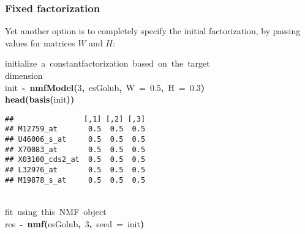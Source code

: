\documentclass[a4paper]{article}\usepackage{graphicx, color}
\makeatletter
\newcommand{\hlnumber}[1]{\textcolor[rgb]{0,0,0}{#1}}%
\newcommand{\hlfunctioncall}[1]{\textcolor[rgb]{0.501960784313725,0,0.329411764705882}{\textbf{#1}}}%
\newcommand{\hlkeyword}[1]{\textcolor[rgb]{0,0,0}{\textbf{#1}}}%
\newcommand{\hlargument}[1]{\textcolor[rgb]{0.690196078431373,0.250980392156863,0.0196078431372549}{#1}}%
\newcommand{\hlcomment}[1]{\textcolor[rgb]{0.180392156862745,0.6,0.341176470588235}{#1}}%
\newcommand{\hlassignement}[1]{\textcolor[rgb]{0,0,0}{\textbf{#1}}}%
\newcommand{\hlsymbol}[1]{\textcolor[rgb]{0,0,0}{#1}}%
\newcommand{\hlstd}[1]{\textcolor[rgb]{0,0,0}{#1}}%
\newenvironment{kframe}{%
 \def\FrameCommand##1{\hskip\@totalleftmargin \hskip-\fboxsep
 \colorbox{shadecolor}{##1}\hskip-\fboxsep
     \hskip-\linewidth \hskip-\@totalleftmargin \hskip\columnwidth}%
 \MakeFramed {\advance\hsize-\width
   \@totalleftmargin\z@ \linewidth\hsize
   \@setminipage}}%
 {\par\unskip\endMakeFramed}
\newenvironment{knitrout}{}{} %
\makeatother
\begin{document}
\subsubsection{Fixed factorization}
Yet another option is to completely specify the initial factorization, by passing values for matrices $W$ and $H$:
\begin{knitrout}
\color{fgcolor}\begin{kframe}
\begin{flushleft}
\ttfamily\noindent
\hlcomment{\usebox{\hlnormalsizeboxhash}{\ }initialize{\ }a{\ }\usebox{\hlnormalsizeboxsinglequote}constant\usebox{\hlnormalsizeboxsinglequote}{\ }factorization{\ }based{\ }on{\ }the{\ }target}\hspace*{\fill}\\
\hlstd{}\hlcomment{\usebox{\hlnormalsizeboxhash}{\ }dimension}\hspace*{\fill}\\
\hlstd{}\hlsymbol{init}{\ }\hlassignement{\usebox{\hlnormalsizeboxlessthan}-}{\ }\hlfunctioncall{nmfModel}\hlkeyword{(}\hlnumber{3}\hlkeyword{,}{\ }\hlsymbol{esGolub}\hlkeyword{,}{\ }\hlargument{W}{\ }\hlargument{=}{\ }\hlnumber{0.5}\hlkeyword{,}{\ }\hlargument{H}{\ }\hlargument{=}{\ }\hlnumber{0.3}\hlkeyword{)}\hspace*{\fill}\\
\hlstd{}\hlfunctioncall{head}\hlkeyword{(}\hlfunctioncall{basis}\hlkeyword{(}\hlsymbol{init}\hlkeyword{)}\hlkeyword{)}\mbox{}
\normalfont
\end{flushleft}
\begin{verbatim}
##                [,1] [,2] [,3]
## M12759_at       0.5  0.5  0.5
## U46006_s_at     0.5  0.5  0.5
## X70083_at       0.5  0.5  0.5
## X03100_cds2_at  0.5  0.5  0.5
## L32976_at       0.5  0.5  0.5
## M19878_s_at     0.5  0.5  0.5
\end{verbatim}
\begin{flushleft}
\ttfamily\noindent
\hspace*{\fill}\\
\hlstd{}\hlcomment{\usebox{\hlnormalsizeboxhash}{\ }fit{\ }using{\ }this{\ }NMF{\ }object}\hspace*{\fill}\\
\hlstd{}\hlsymbol{res}{\ }\hlassignement{\usebox{\hlnormalsizeboxlessthan}-}{\ }\hlfunctioncall{nmf}\hlkeyword{(}\hlsymbol{esGolub}\hlkeyword{,}{\ }\hlnumber{3}\hlkeyword{,}{\ }\hlargument{seed}{\ }\hlargument{=}{\ }\hlsymbol{init}\hlkeyword{)}\mbox{}
\normalfont
\end{flushleft}
\end{kframe}
\end{knitrout}
\end{document}

